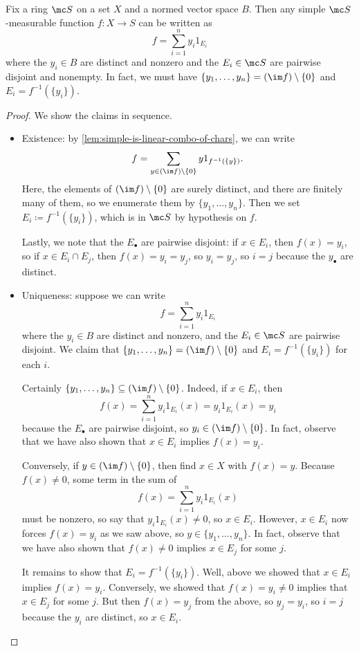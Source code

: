 \documentclass[../notes.tex]{subfiles}
\begin{document}
\begin{lemma} \label{lem:simple-form}
	Fix a ring $\mc S$ on a set $X$ and a normed vector space $B$. Then any simple $\mc S$-measurable function $f\colon X\to S$ can be written as
	\[f=\sum_{i=1}^ny_i1_{E_i}\]
	where the $y_i\in B$ are distinct and nonzero and the $E_i\in\mc S$ are pairwise disjoint and nonempty. In fact, we must have $\{y_1,\ldots,y_n\}=(\im f)\setminus\{0\}$ and $E_i=f^{-1}(\{y_i\})$.
\end{lemma}
\begin{proof}
	We show the claims in sequence.
	\begin{itemize}
		\item Existence: by \autoref{lem:simple-is-linear-combo-of-chars}, we can write
		\[f=\sum_{y\in(\im f)\setminus\{0\}}y1_{f^{-1}(\{y\})}.\]
		Here, the elements of $(\im f)\setminus\{0\}$ are surely distinct, and there are finitely many of them, so we enumerate them by $\{y_1,\ldots,y_n\}$. Then we set $E_i\coloneqq f^{-1}(\{y_i\})$, which is in $\mc S$ by hypothesis on $f$.

		Lastly, we note that the $E_\bullet$ are pairwise disjoint: if $x\in E_i$, then $f(x)=y_i$, so if $x\in E_i\cap E_j$, then $f(x)=y_i=y_j$, so $y_i=y_j$, so $i=j$ because the $y_\bullet$ are distinct.

		\item Uniqueness: suppose we can write
		\[f=\sum_{i=1}^ny_i1_{E_i}\]
		where the $y_i\in B$ are distinct and nonzero, and the $E_i\in\mc S$ are pairwise disjoint. We claim that $\{y_1,\ldots,y_n\}=(\im f)\setminus\{0\}$ and $E_i=f^{-1}(\{y_i\})$ for each $i$.

		Certainly $\{y_1,\ldots,y_n\}\subseteq(\im f)\setminus\{0\}$. Indeed, if $x\in E_i$, then
		\[f(x)=\sum_{i=1}^ny_i1_{E_i}(x)=y_i1_{E_i}(x)=y_i\]
		because the $E_\bullet$ are pairwise disjoint, so $y_i\in(\im f)\setminus\{0\}$. In fact, observe that we have also shown that $x\in E_i$ implies $f(x)=y_i$.
		
		Conversely, if $y\in(\im f)\setminus\{0\}$, then find $x\in X$ with $f(x)=y$. Because $f(x)\ne0$, some term in the sum of
		\[f(x)=\sum_{i=1}^ny_i1_{E_i}(x)\]
		must be nonzero, so say that $y_i1_{E_i}(x)\ne0$, so $x\in E_i$. However, $x\in E_i$ now forces $f(x)=y_i$ as we saw above, so $y\in\{y_1,\ldots,y_n\}$. In fact, observe that we have also shown that $f(x)\ne0$ implies $x\in E_j$ for some $j$.

		It remains to show that $E_i=f^{-1}(\{y_i\})$. Well, above we showed that $x\in E_i$ implies $f(x)=y_i$. Conversely, we showed that $f(x)=y_i\ne0$ implies that $x\in E_j$ for some $j$. But then $f(x)=y_j$ from the above, so $y_j=y_i$, so $i=j$ because the $y_i$ are distinct, so $x\in E_i$.
		\qedhere
	\end{itemize}
\end{proof}
\end{document}
